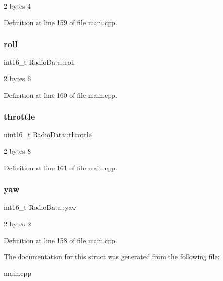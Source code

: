2 bytes 4 



Definition at line 159 of file main.\+cpp.

\mbox{\label{structRadioData_a37f0ff8a110b97904c5e82fd907003ae}} 
\subsubsection{\texorpdfstring{roll}{roll}}
{\footnotesize\ttfamily int16\+\_\+t Radio\+Data\+::roll}



2 bytes 6 



Definition at line 160 of file main.\+cpp.

\mbox{\label{structRadioData_a21c133a1b58627f5386f5652400f0931}} 
\subsubsection{\texorpdfstring{throttle}{throttle}}
{\footnotesize\ttfamily uint16\+\_\+t Radio\+Data\+::throttle}



2 bytes 8 



Definition at line 161 of file main.\+cpp.

\mbox{\label{structRadioData_a241a1c2bfcf77c02542c9f71dfc3f29e}} 
\subsubsection{\texorpdfstring{yaw}{yaw}}
{\footnotesize\ttfamily int16\+\_\+t Radio\+Data\+::yaw}



2 bytes 2 



Definition at line 158 of file main.\+cpp.



The documentation for this struct was generated from the following file\+:\begin{DoxyCompactItemize}
\item 
main.\+cpp\end{DoxyCompactItemize}
